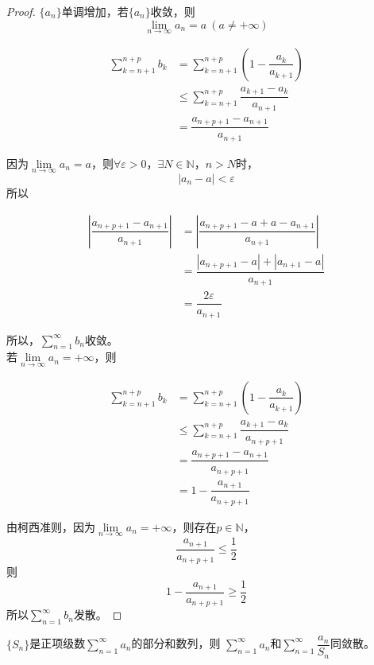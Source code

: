 \begin{proof}

    $\{a_n\}$单调增加，若$\{a_n\}$收敛，则
    $$\lim\limits_{n\to\infty}{a_n}=a \ (a\neq+\infty)$$

    \begin{align*}
        \sum\limits_{k=n+1}^{n+p}{b_k} &= \sum\limits_{k=n+1}^{n+p}{(1-\dfrac{a_k}{a_{k+1}})}\\
        & \leq \sum\limits_{k=n+1}^{n+p}{\dfrac{a_{k+1}-a_k}{a_{n+1}}}\\
        & = \dfrac{a_{n+p+1}-a_{n+1}}{a_{n+1}}
    \end{align*}

    因为$\lim\limits_{n\to\infty}{a_n}=a$，则$\forall \varepsilon >0$，$\exists N\in \mathbb{N}$，$n>N$时，
    $$|a_n-a|<\varepsilon$$
    所以

    \begin{align*}
        \left| \dfrac{a_{n+p+1}-a_{n+1}}{a_{n+1}}\right| &= \left| \dfrac{a_{n+p+1}-a + a -a_{n+1}}{a_{n+1}}\right|\\
        & = \dfrac{|a_{n+p+1}-a|+|a_{n+1}-a|}{a_{n+1}}\\
        & = \dfrac{2\varepsilon}{a_{n+1}}
    \end{align*} 

    所以，$\sum\limits_{n=1}^{\infty}{b_n}$收敛。\\
    若$\lim\limits_{n\to\infty}{a_n}=+\infty$，则

    \begin{align*}
        \sum\limits_{k=n+1}^{n+p}{b_k} &= \sum\limits_{k=n+1}^{n+p}{(1-\dfrac{a_k}{a_{k+1}})}\\
        & \leq \sum\limits_{k=n+1}^{n+p}{\dfrac{a_{k+1}-a_k}{a_{n+p+1}}}\\
        & = \dfrac{a_{n+p+1}-a_{n+1}}{a_{n+p+1}}\\
        & = 1-\dfrac{a_{n+1}}{a_{n+p+1}}
    \end{align*}

    由柯西准则，因为$\lim\limits_{n\to\infty}{a_n}=+\infty$，则存在$p \in \mathbb{N}$，
    $$ \dfrac{a_{n+1}}{a_{n+p+1}} \leq \dfrac{1}{2}$$
    则
    $$ 1-\dfrac{a_{n+1}}{a_{n+p+1}} \geq \dfrac{1}{2}$$
    所以$\sum\limits_{n=1}^{\infty}{b_n}$发散。

\end{proof}

\begin{theorem}
    
    $\{S_n\}$是正项级数$\sum\limits_{n=1}^{\infty}{a_n}$的部分和数列，则
    $\sum\limits_{n=1}^{\infty}{a_n}$和$\sum\limits_{n=1}^{\infty}{\dfrac{a_n}{S_n}}$同敛散。

\end{theorem}

